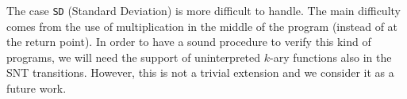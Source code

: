 The case \texttt{SD} (Standard Deviation) is more difficult to handle. The main difficulty comes from the use of multiplication in the middle of the program (instead of at the return point). In order to have a sound procedure to verify this kind of programs, we will need the support of uninterpreted $k$-ary functions also in the SNT transitions. However, this is not a trivial extension and we consider it as a future work.


